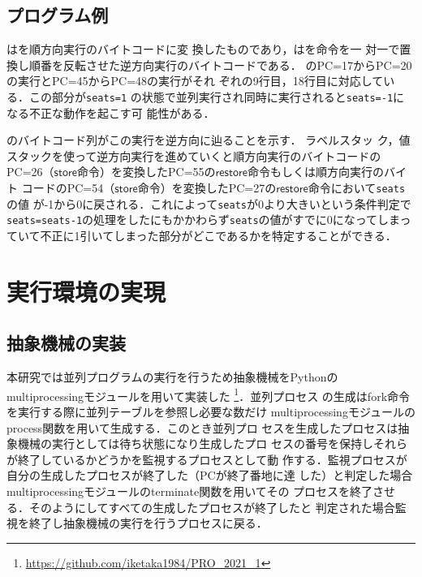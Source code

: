 \documentclass[submit,PRO]{ipsj}
\newcommand{\bcode}[1]{$\mathsf{#1}$}
\begin{document}
\subsection{プログラム例}

はを順方向実行のバイトコードに変
換したものであり，はを命令を一
対一で置換し順番を反転させた逆方向実行のバイトコードである．
のPC=17からPC=20の実行とPC=45からPC=48の実行がそれ
ぞれの9行目，18行目に対応している．この部分が\texttt{seats=1}
の状態で並列実行され同時に実行されると\texttt{seats=-1}になる不正な動作を起こす可
能性がある．

のバイトコード列がこの実行を逆方向に辿ることを示す．
ラベルスタッ
ク，値スタックを使って逆方向実行を進めていくと順方向実行のバイトコードの
PC=26（\bcode{store}命令）を変換したPC=55の\bcode{restore}命令もしくは順方向実行のバイト
コードのPC=54（\bcode{store}命令）を変換したPC=27の\bcode{restore}命令において\texttt{seats}の値
が-1から0に戻される．これによって\texttt{seats}が0より大きいという条件判定で
\texttt{seats=seats-1}の処理をしたにもかかわらず\texttt{seats}の値がすでに0になってしまっ
ていて不正に1引いてしまった部分がどこであるかを特定することができる．

\section{実行環境の実現}

\subsection{抽象機械の実装}

本研究では並列プログラムの実行を行うため抽象機械をPythonの
multiprocessingモジュールを用いて実装した
\footnote{\url{https://github.com/iketaka1984/PRO_2021_1}}．並列プロセス
の生成はfork命令を実行する際に並列テーブルを参照し必要な数だけ
multiprocessingモジュールのprocess関数を用いて生成する．このとき並列プロ
セスを生成したプロセスは抽象機械の実行としては待ち状態になり生成したプロ
セスの番号を保持しそれらが終了しているかどうかを監視するプロセスとして動
作する．監視プロセスが自分の生成したプロセスが終了した（PCが終了番地に達
した）と判定した場合multiprocessingモジュールのterminate関数を用いてその
プロセスを終了させる．そのようにしてすべての生成したプロセスが終了したと
判定された場合監視を終了し抽象機械の実行を行うプロセスに戻る．
\end{document}
